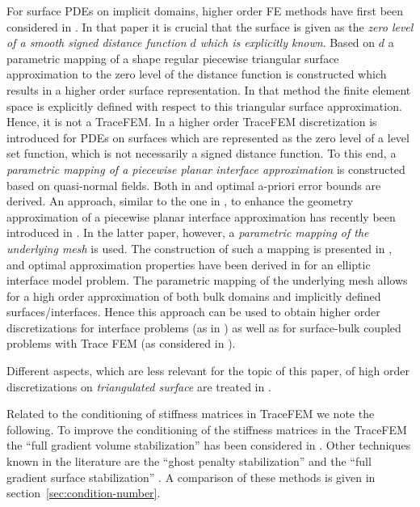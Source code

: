 \documentclass[final]{siamltex}
\begin{document}
For surface PDEs on implicit domains, higher order FE methods have first been considered in \cite{demlow2009higher}. In that paper it is crucial that the surface is given as the \emph{zero level of a smooth signed distance function $d$ which is explicitly known}. Based on $d$ a parametric mapping of a shape regular piecewise triangular surface approximation to the zero level of the distance function is constructed which results in a higher order surface representation. In that method the finite element space is explicitly defined with respect to this triangular surface approximation. Hence, it is not a TraceFEM.
In \cite{grande2014highordersjna} a higher order TraceFEM discretization is introduced for PDEs on surfaces which are represented as the zero level of a level set function, which is not necessarily a signed distance function. To this end, 
a \emph{parametric mapping of a piecewise planar interface approximation} 
is constructed based on quasi-normal fields. Both in \cite{demlow2009higher} and \cite{grande2014highordersjna} optimal a-priori error bounds are derived. 
An approach, similar to the one in \cite{grande2014highordersjna}, to enhance the geometry approximation of a piecewise planar interface approximation has recently been introduced in \cite{lehrenfeld2015cmame}. In the latter paper, however, a \emph{parametric mapping of the underlying mesh} is used. The construction of such a mapping is presented in \cite{lehrenfeld2015cmame}, and optimal approximation properties have been derived in \cite{CLARH1} for an elliptic interface model problem. 
The parametric mapping of the underlying mesh allows for a high order approximation of both bulk domains and implicitly defined surfaces/interfaces. Hence this approach can be used to obtain higher order discretizations for interface problems (as in \cite{CLARH1}) as well as for surface-bulk coupled problems with Trace FEM (as considered in \cite{goresaim}).

Different aspects, which are less relevant for the topic of this paper, of high order discretizations on \emph{triangulated surface} are treated in \cite{demlow2009higher,langer2014discontinuousbook,antonietti2015high}.

Related to the conditioning of stiffness matrices in TraceFEM we note the following. To improve the conditioning of the stiffness matrices in the TraceFEM  the ``full gradient volume stabilization'' has been considered in \cite{burman16fullgradcmame,reusken2015}. Other techniques known in the literature are the ``ghost penalty stabilization'' \cite{Burman2010,BHL15} and the ``full gradient surface stabilization'' \cite{DER14,reusken2015}. A comparison of these methods is given in section~\ref{sec:condition-number}.
\end{document}
